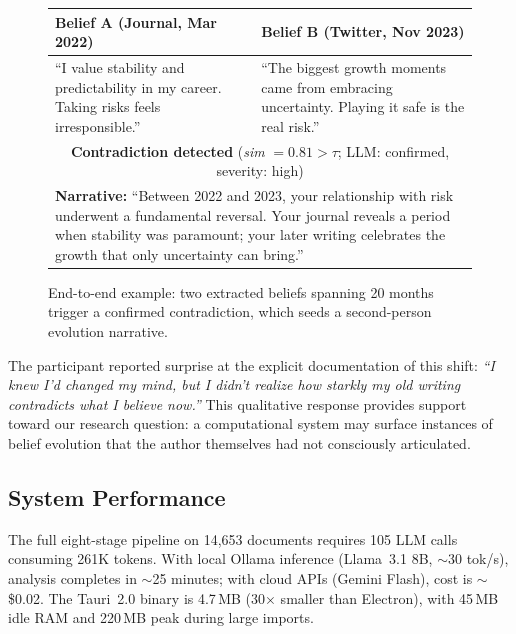 \documentclass[conference]{IEEEtran}
\begin{document}
\begin{figure}[t]
\centering
\scriptsize
\setlength{\tabcolsep}{3pt}
\begin{tabular}{|p{3.45cm}|p{3.45cm}|}
\hline
\textbf{Belief A} {\tiny(Journal, Mar 2022)} &
\textbf{Belief B} {\tiny(Twitter, Nov 2023)} \\
\hline
``I value stability and predictability in my career. Taking risks feels irresponsible.'' &
``The biggest growth moments came from embracing uncertainty. Playing it safe is the real risk.'' \\
\hline
\multicolumn{2}{|c|}{\cellcolor{red!10}%
  \textbf{Contradiction detected} \;
  (\textit{sim} $= 0.81 > \tau$; LLM: confirmed, severity: high)}\\
\hline
\multicolumn{2}{|p{7.15cm}|}{%
  \textbf{Narrative:} ``Between 2022 and 2023, your relationship with risk underwent a fundamental reversal. Your journal reveals a period when stability was paramount; your later writing celebrates the growth that only uncertainty can bring.''}\\
\hline
\end{tabular}
\caption{End-to-end example: two extracted beliefs spanning 20 months trigger a confirmed contradiction, which seeds a second-person evolution narrative.}
\label{fig:example}
\end{figure}

The participant reported surprise at the explicit documentation of this shift: \emph{``I knew I'd changed my mind, but I didn't realize how starkly my old writing contradicts what I believe now.''} This qualitative response provides support toward our research question: a computational system may surface instances of belief evolution that the author themselves had not consciously articulated.

\subsection{System Performance}

The full eight-stage pipeline on 14,653 documents requires 105 LLM calls consuming 261K tokens. With local Ollama inference (Llama~3.1 8B, ${\sim}$30 tok/s), analysis completes in ${\sim}$25 minutes; with cloud APIs (Gemini Flash), cost is ${\sim}$\$0.02. The Tauri~2.0 binary is 4.7\,MB (30$\times$ smaller than Electron), with 45\,MB idle RAM and 220\,MB peak during large imports.

\end{document}
